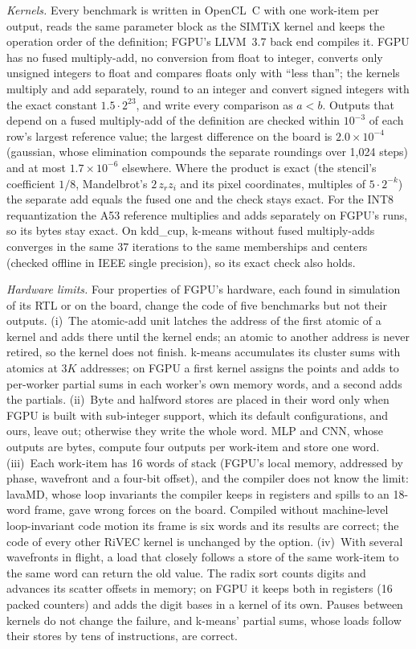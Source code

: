 \documentclass[journal]{IEEEtran}
\begin{document}
\emph{Kernels.} Every benchmark is written in OpenCL~C with one work-item per output,
reads the same parameter block as the SIMTiX kernel and keeps the operation order of the
definition; FGPU's LLVM~3.7 back end compiles it. FGPU has no fused multiply-add, no
conversion from float to integer, converts only unsigned integers to float and compares
floats only with ``less than''; the kernels multiply and add separately, round to an
integer and convert signed integers with the exact constant $1.5\cdot2^{23}$, and write
every comparison as $a<b$. Outputs that depend on a fused multiply-add of the definition
are checked within $10^{-3}$ of each row's largest reference value; the largest
difference on the board is $2.0\times10^{-4}$ (gaussian, whose elimination compounds
the separate roundings over 1,024 steps) and at most $1.7\times10^{-6}$ elsewhere. Where
the product is exact (the stencil's coefficient $1/8$, Mandelbrot's $2\,z_rz_i$ and its
pixel coordinates, multiples of $5\cdot2^{-k}$) the separate add equals the fused one and
the check stays exact. For the INT8 requantization the A53 reference multiplies and adds
separately on FGPU's runs, so its bytes stay exact. On kdd\_cup, k-means without fused
multiply-adds converges in the same 37 iterations to the same memberships and centers
(checked offline in IEEE single precision), so its exact check also holds.

\emph{Hardware limits.} Four properties of FGPU's hardware, each found in simulation of
its RTL or on the board, change the code of five benchmarks but not their outputs.
(i)~The atomic-add unit latches the address of the first atomic of a kernel and adds
there until the kernel ends; an atomic to another address is never retired, so the
kernel does not finish. k-means accumulates its cluster sums with atomics at
$3K$ addresses; on FGPU a first kernel assigns the points and adds to per-worker partial
sums in each worker's own memory words, and a second adds the partials.
(ii)~Byte and halfword stores are placed in their word only when FGPU is built with
sub-integer support, which its default configurations, and ours, leave out; otherwise
they write the whole word. MLP and CNN, whose outputs are bytes, compute four outputs
per work-item and store one word.
(iii)~Each work-item has 16 words of stack (FGPU's local memory, addressed by phase,
wavefront and a four-bit offset), and the compiler does not know the limit: lavaMD,
whose loop invariants the compiler keeps in registers and spills to an 18-word frame,
gave wrong forces on the board. Compiled without machine-level loop-invariant code
motion its frame is six words and its results are correct; the code of every other
RiVEC kernel is unchanged by the option.
(iv)~With several wavefronts in flight, a load that closely follows a store of the same
work-item to the same word can return the old value. The radix sort counts digits and
advances its scatter offsets in memory; on FGPU it keeps both in registers (16 packed
counters) and adds the digit bases in a kernel of its own. Pauses between kernels do not
change the failure, and k-means' partial sums, whose loads follow their stores by tens
of instructions, are correct.
\end{document}
